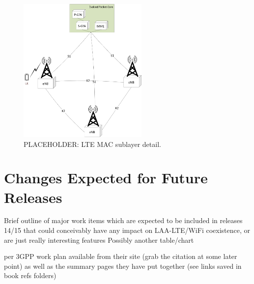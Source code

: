 \begin{figure}[!ht]
	\centering
	\includegraphics[width=2.5in]{figures3/lteAnet}
	\caption{PLACEHOLDER: LTE MAC sublayer detail.}
	\label{figs:LTE-MAC-protocol}
\end{figure}



\section {Changes Expected for Future Releases}
\label{fut-chnge}
Brief outline of major work items which are expected to be included in releases 14/15 that could conceivably have any impact on LAA-LTE/WiFi coexistence, or are just really interesting features 
Possibly another table/chart

per 3GPP work plan available from their site (grab the citation at some later point) as well as the summary pages they have put together (see links saved in book refs folders)
